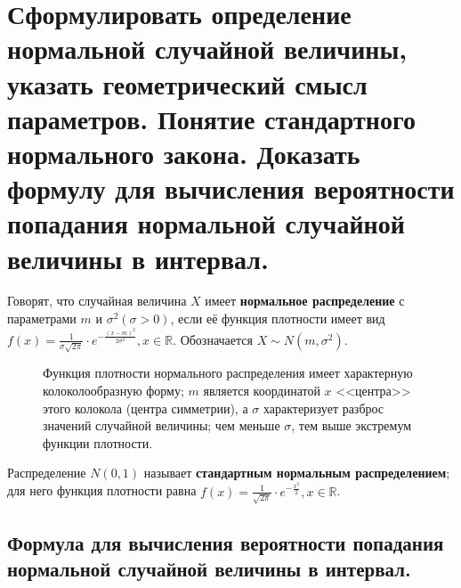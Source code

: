 \section{Сформулировать определение нормальной случайной величины, указать геометрический смысл параметров. Понятие стандартного нормального закона. Доказать формулу для вычисления вероятности попадания нормальной случайной величины в интервал.}

Говорят, что случайная величина $X$ имеет \textbf{нормальное распределение} с параметрами $m$ и $\sigma^2 (\sigma > 0)$, если её функция плотности имеет вид $f(x) = \frac{1}{\sigma\sqrt{2\pi}} \cdot e^{-\frac{(x-m)^2}{2\sigma^2}}, x \in \mathbb{R}$. Обозначается $X \sim N(m, \sigma^2)$.


\begin{figure}[ht!]
	\begin{minipage}{0.4\textwidth}
	\end{minipage}%
	\hfill
	\begin{minipage}{0.45\textwidth}
		Функция плотности нормального распределения имеет характерную колоколообразную форму; $m$ является координатой $x$ <<центра>> этого колокола (центра симметрии), а $\sigma$ характеризует разброс значений случайной величины; чем меньше $\sigma$, тем выше экстремум функции плотности.
	\end{minipage}
\end{figure}

Распределение $N(0, 1)$ называет \textbf{стандартным нормальным распределением}; для него функция плотности равна $f(x) = \frac{1}{\sqrt{2\pi}} \cdot e^{-\frac{x^2}{2}}, x \in \mathbb{R}$.

\subsection*{Формула для вычисления вероятности попадания нормальной случайной величины в интервал.}

